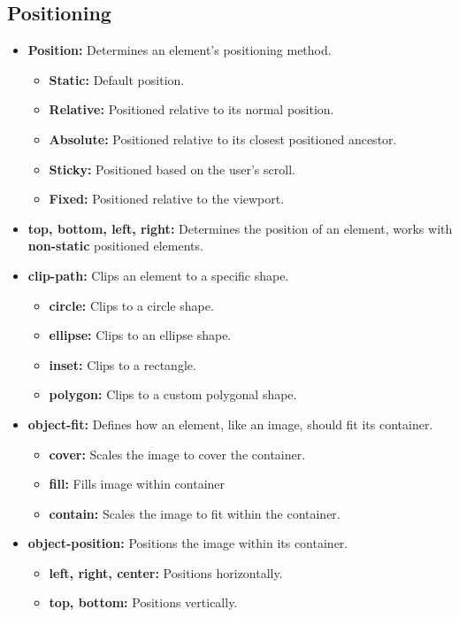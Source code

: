\documentclass{report}
\begin{document}
    \bigbreak \noindent 
    \subsection{Positioning}
    \begin{itemize}
        \item \textbf{Position:} Determines an element's positioning method.
            \begin{itemize}
                \item \textbf{Static:} Default position.
                \item \textbf{Relative:} Positioned relative to its normal position.
                \item \textbf{Absolute:} Positioned relative to its closest positioned ancestor.
                \item \textbf{Sticky:} Positioned based on the user's scroll.
                \item \textbf{Fixed:} Positioned relative to the viewport.
            \end{itemize}
        \item \textbf{top, bottom, left, right:} Determines the position of an element, works with \textbf{non-static} positioned elements.
        \item \textbf{clip-path:} Clips an element to a specific shape.
            \begin{itemize}
                \item \textbf{circle:} Clips to a circle shape.
                \item \textbf{ellipse:} Clips to an ellipse shape.
                \item \textbf{inset:} Clips to a rectangle.
                \item \textbf{polygon:} Clips to a custom polygonal shape.
            \end{itemize}
        \item \textbf{object-fit:} Defines how an element, like an image, should fit its container.
            \begin{itemize}
                \item \textbf{cover:} Scales the image to cover the container.
                \item \textbf{fill:} Fills image  within container
                \item \textbf{contain:} Scales the image to fit within the container.
            \end{itemize}
        \item \textbf{object-position:} Positions the image within its container.
            \begin{itemize}
                \item \textbf{left, right, center:} Positions horizontally.
                \item \textbf{top, bottom:} Positions vertically.
            \end{itemize}
    \end{itemize}
\end{document}
